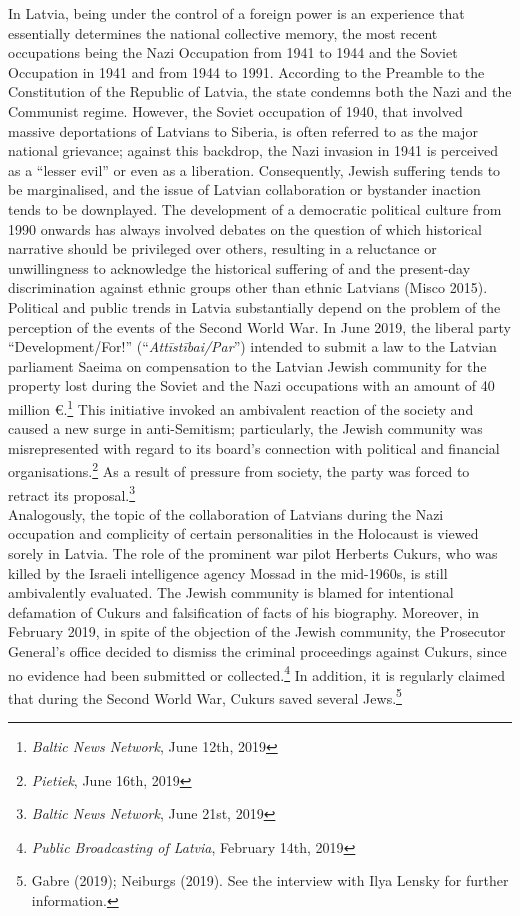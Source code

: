 In Latvia, being under the control of a foreign power is an experience that essentially determines the national collective memory, the most recent occupations being the Nazi Occupation from 1941 to 1944 and the Soviet Occupation in 1941 and from 1944 to 1991. According to the Preamble to the Constitution of the Republic of Latvia, the state condemns both the Nazi and the Communist regime. However, the Soviet occupation of 1940, that involved massive deportations of Latvians to Siberia, is often referred to as the major national grievance; against this backdrop, the Nazi invasion in 1941 is perceived as a “lesser evil” or even as a liberation. Consequently, Jewish suffering tends to be marginalised, and the issue of Latvian collaboration or bystander inaction tends to be downplayed. The development of a democratic political culture from 1990 onwards has always involved debates on the question of which historical narrative should be privileged over others, resulting in a reluctance or unwillingness to acknowledge the historical suffering of and the present-day discrimination against ethnic groups other than ethnic Latvians (Misco 2015). \\
Political and public trends in Latvia substantially depend on the problem of the perception of the events of the Second World War. In June 2019, the liberal party ``Development/For!'' (``\textit{Attīstībai/Par}'') intended to submit a law to the Latvian parliament Saeima on compensation to the Latvian Jewish community for the property lost during the Soviet and the Nazi occupations with an amount of 40 million \euro{}.\footnote{\textit{Baltic News Network}, June 12th, 2019} This initiative invoked an ambivalent reaction of the society and caused a new surge in anti-Semitism; particularly, the Jewish community was misrepresented with regard to its board’s connection with political and financial organisations.\footnote{\textit{Pietiek}, June 16th, 2019} As a result of pressure from society, the party was forced to retract its proposal.\footnote{\textit{Baltic News Network}, June 21st, 2019}\\  
Analogously, the topic of the collaboration of Latvians during the Nazi occupation and complicity of certain personalities in the Holocaust is viewed sorely in Latvia. The role of the prominent war pilot Herberts Cukurs, who was killed by the Israeli intelligence agency Mossad in the mid-1960s, is still ambivalently evaluated. The Jewish community is blamed for intentional defamation of Cukurs and falsification of facts of his biography. Moreover, in February 2019, in spite of the objection of the Jewish community, the Prosecutor General's office decided to dismiss the criminal proceedings against Cukurs, since no evidence had been submitted or collected.\footnote{\textit{Public Broadcasting of Latvia}, February 14th, 2019} In addition, it is regularly claimed that during the Second World War, Cukurs saved several Jews.\footnote{Gabre (2019); Neiburgs (2019). See the interview with Ilya Lensky for further information.}\\
